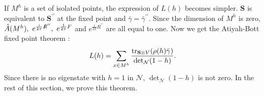 \documentclass[11pt]{article}
\begin{document}


If $M^h$ is a set of isolated points, the expression of $L(h)$ becomes simpler. $\mathbf{S}$ is equivalent to $\mathbf{S}^{\prime \prime}$ at the fixed point and $\bar{\gamma}=\bar{\gamma}^{\prime \prime}$. Since the dimension of $M^h$ is zero, $\hat{A} (M^h), ~e^{\frac{i}{2\pi} \slashed{R}^{\prime\prime} } ,~ e^{\frac{1}{2\pi} F} $ and $e^{\frac{i}{2\pi} R^{\prime\prime}}$ are all equal to one. Now we get the Atiyah-Bott fixed point theorem \cite{atiyah1967lefschetz}:
\begin{align}
    L(h)= \sum_{x \in M^h} \frac{ \text{tr}_{\mathbf{S} \otimes V} \qty( \rho(h) \bar{\gamma}  )}   {  \det_\mathcal{N}( 1-  h)}. \label{eq:AtiyahBott}
\end{align}
Since there is no eigenstate with $h=1$ in $\mathcal{N}$, $\det_\mathcal{N}(1-h)$ is not zero. In the rest of this section, we prove this theorem.
\end{document}
